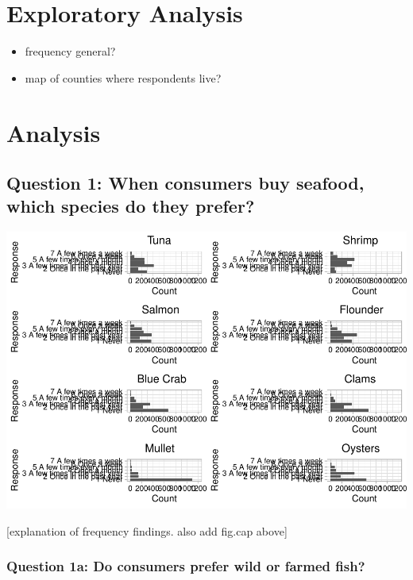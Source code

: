 \documentclass[
  12pt,
]{article}
\providecommand{\tightlist}{%
  \setlength{\itemsep}{0pt}\setlength{\parskip}{0pt}}
\begin{document}
\newpage

\hypertarget{exploratory-analysis}{%
\section{Exploratory Analysis}\label{exploratory-analysis}}

\begin{itemize}
\tightlist
\item
  frequency general?
\item
  map of counties where respondents live?
\end{itemize}

\newpage

\hypertarget{analysis}{%
\section{Analysis}\label{analysis}}

\hypertarget{question-1-when-consumers-buy-seafood-which-species-do-they-prefer}{%
\subsection{Question 1: When consumers buy seafood, which species do
they
prefer?}\label{question-1-when-consumers-buy-seafood-which-species-do-they-prefer}}

\includegraphics{Final_rmd_files/figure-latex/frequency-1.pdf}

{[}explanation of frequency findings. also add fig.cap above{]}

\hypertarget{question-1a-do-consumers-prefer-wild-or-farmed-fish}{%
\subsubsection{Question 1a: Do consumers prefer wild or farmed
fish?}\label{question-1a-do-consumers-prefer-wild-or-farmed-fish}}
\end{document}
